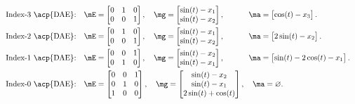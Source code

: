 \begin{equation*}
  \begin{array}{l}
    \text{Index-3 \acp{DAE}:} \quad \mE = \begin{bmatrix}
      0 & 1 & 0 \\
      0 & 0 & 1
    \end{bmatrix}, \quad
    \mg = \begin{bmatrix}
      \sin(t) - x_{1} \\
      \sin(t) - x_{2}
    \end{bmatrix}, \quad\quad~~~\,
    \ma = \begin{bmatrix}
      \cos(t) - x_{3}
    \end{bmatrix}. \\[1.0em]
    \text{Index-2 \acp{DAE}:} \quad \mE = \begin{bmatrix}
      0 & 1 & 0 \\
      0 & 0 & 1
    \end{bmatrix}, \quad
    \mg = \begin{bmatrix}
      \sin(t) - x_{1} \\
      \sin(t) - x_{2}
    \end{bmatrix}, \quad\quad~~~\,
    \ma = \begin{bmatrix}
      2\sin(t) - x_{2}
    \end{bmatrix}. \\[1.0em]
    \text{Index-1 \acp{DAE}:} \quad \mE = \begin{bmatrix}
      0 & 0 & 1 \\
      0 & 1 & 0
    \end{bmatrix}, \quad
    \mg = \begin{bmatrix}
      \sin(t) - x_{2} \\
      \sin(t) - x_{1}
    \end{bmatrix}, \quad\quad~~~\,
    \ma = \begin{bmatrix}
      \sin(t) - 2\cos(t) - x_{1}
    \end{bmatrix}. \\[1.0em]
    \text{Index-0 \acp{DAE}:} \quad \mE = \begin{bmatrix}
      0 & 0 & 1 \\
      0 & 1 & 0 \\
      1 & 0 & 0
    \end{bmatrix}, \quad
    \mg = \begin{bmatrix}
      \sin(t) - x_{2} \\
      \sin(t) - x_{1} \\
      2\sin(t) + \cos(t)
    \end{bmatrix}, \quad
    \ma = \varnothing.
  \end{array}
\end{equation*}
